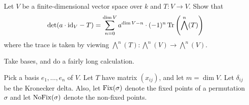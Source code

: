 \begin{problem}
	\twochili
	Let $V$ be a finite-dimensional vector space over $k$ and $T \colon V \to V$.
	Show that
	\[
		\det(a \cdot \mathrm{id}_V - T) =
		\sum_{n=0}^{\dim V} a^{\dim V-n} \cdot (-1)^n
		\operatorname{Tr}\left( \bigwedge^n(T) \right)
	\]
	where the trace is taken by viewing $\bigwedge^n(T) \colon \bigwedge^n(V) \to \bigwedge^n(V)$.
	\begin{hint}
		Take bases, and do a fairly long calculation.
	\end{hint}
	\begin{sol}
		\newcommand{\Fix}{\opname{Fix}}
		\newcommand{\NoFix}{\opname{NoFix}}
		Pick a basis $e_1, \dots, e_n$ of $V$.
		Let $T$ have matrix $(x_{ij})$, and let $m = \dim V$.
		Let $\delta_{ij}$ be the Kronecker delta.
		Also, let $\Fix(\sigma)$ denote the fixed points of a permutation $\sigma$
		and let $\NoFix(\sigma)$ denote the non-fixed points.


\end{sol}
\end{problem}
